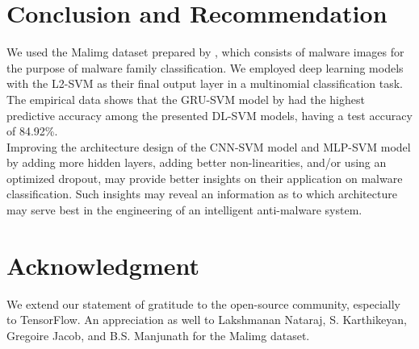 \documentclass[sigconf]{acmart}
\begin{document}
\section{Conclusion and Recommendation}
We used the Malimg dataset prepared by \cite{nataraj2011malware}, which consists of malware images for the purpose of malware family classification. We employed deep learning models with the L2-SVM as their final output layer in a multinomial classification task. The empirical data shows that the GRU-SVM model by \cite{agarap2017neural} had the highest predictive accuracy among the presented DL-SVM models, having a test accuracy of 84.92\%.\\
\indent	Improving the architecture design of the CNN-SVM model and MLP-SVM model by adding more hidden layers, adding better non-linearities, and/or using an optimized dropout, may provide better insights on their application on malware classification. Such insights may reveal an information as to which architecture may serve best in the engineering of an intelligent anti-malware system.

\section{Acknowledgment}
We extend our statement of gratitude to the open-source community, especially to TensorFlow. An appreciation as well to Lakshmanan Nataraj, S. Karthikeyan, Gregoire Jacob, and B.S. Manjunath for the Malimg dataset\cite{nataraj2011malware}. 

 
\end{document}
